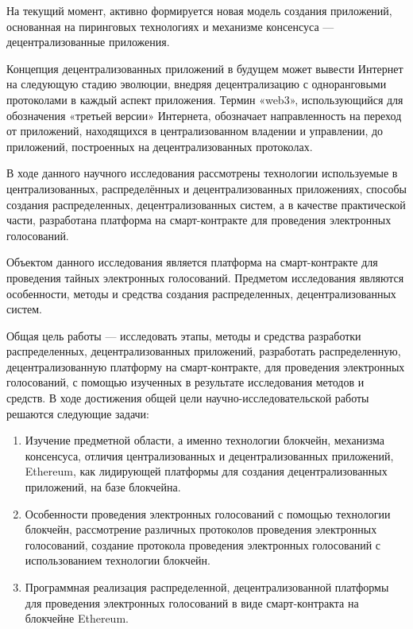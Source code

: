 \intro
На текущий момент, активно формируется новая модель создания приложений, основанная на пиринговых технологиях и механизме консенсуса — децентрализованные приложения.

Концепция децентрализованных приложений в будущем может вывести Интернет на следующую стадию эволюции, внедряя децентрализацию с одноранговыми протоколами в каждый аспект приложения. Термин «web3», использующийся для обозначения «третьей версии» Интернета, обозначает направленность на переход от приложений, находящихся в централизованном владении и управлении, до приложений, построенных на децентрализованных протоколах.

В ходе данного научного исследования рассмотрены технологии используемые в централизованных, распределённых и децентрализованных приложениях, способы создания распределенных, децентрализованных систем, а в качестве практической части, разработана платформа на смарт-контракте для проведения электронных голосований.

Объектом данного исследования является платформа на смарт-контракте для проведения тайных электронных голосований. Предметом исследования являются особенности, методы и средства создания распределенных, децентрализованных систем.

Общая цель работы — исследовать этапы, методы и средства разработки распределенных, децентрализованных приложений, разработать распределенную, децентрализованную платформу на смарт-контракте, для проведения электронных голосований, с помощью изученных в результате исследования методов и средств. В ходе достижения общей цели научно-исследовательской работы решаются следующие задачи:

\begin{enumerate} 
  \item Изучение предметной области, а именно технологии блокчейн, механизма консенсуса, отличия централизованных и децентрализованных приложений, Ethereum, как лидирующей платформы для создания децентрализованных приложений, на базе блокчейна.
  
  \item Особенности проведения электронных голосований с помощью технологии блокчейн, рассмотрение различных протоколов проведения электронных голосований, создание протокола проведения электронных голосований с использованием технологии блокчейн.
  
  \item Программная реализация распределенной, децентрализованной платформы для проведения электронных голосований в виде смарт-контракта на блокчейне Ethereum.
\end{enumerate}